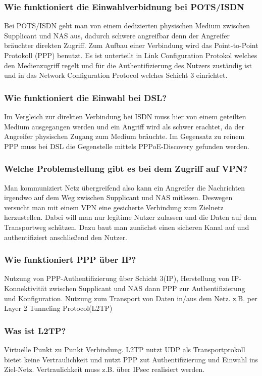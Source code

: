 		\subsubsection{Wie funktioniert die Einwahlverbidnung bei POTS/ISDN}
		Bei POTS/ISDN geht man von einem dedizierten physischen Medium zwischen Supplicant und NAS aus, dadurch schwere angreifbar denn der Angreifer bräuchter direkten Zugriff. Zum Aufbau einer Verbindung wird das Point-to-Point Protokoll (PPP) benutzt. Es ist unterteilt in Link Configuration Protokol welches den Medienzugriff regelt und für die Authentifizierung des Nutzers zuständig ist und in das Network Configuration Protocol welches Schicht 3 einrichtet.
		
		\subsubsection{Wie funktioniert die Einwahl bei DSL?}
		Im Vergleich zur direkten Verbindung bei ISDN muss hier von einem geteilten Medium ausgegangen werden und ein Angriff wird als schwer erachtet, da der Angreifer physischen Zugang zum Medium bräuchte. Im Gegensatz zu reinem PPP muss bei DSL die Gegenstelle mittels PPPoE-Discovery gefunden werden.
		
		\subsubsection{Welche Problemstellung gibt es bei dem Zugriff auf VPN?}
		Man kommuniziert Netz übergreifend also kann ein Angreifer die Nachrichten irgendwo auf dem Weg zwischen Supplicant und NAS mitlesen. Deswegen versucht man mit einem VPN eine gesicherte Verbindung zum Zielnetz herzustellen. Dabei will man nur legitime Nutzer zulassen und die Daten auf dem Transportweg schützen.
		Dazu baut man zunächst einen sicheren Kanal auf und authentifiziert anschließend den Nutzer.
		
		\subsubsection{Wie funktioniert PPP über IP?}
		Nutzung von PPP-Authentifizierung über Schicht 3(IP), Herstellung von IP-Konnektivität zwischen Supplicant und NAS dann PPP zur Authentifizierung und Konfiguration. Nutzung zum Transport von Daten in/aus dem Netz. z.B. per Layer 2 Tunneling Protocol(L2TP)
		
		\subsubsection{Was ist L2TP?}
		Virtuelle Punkt zu Punkt Verbindung. L2TP nutzt UDP als Transportprokoll bietet keine Vertraulichkeit und nutzt PPP zut Authentifizierung und Einwahl ins Ziel-Netz. Vertraulichkeit muss z.B. über IPsec realisiert werden.
		

